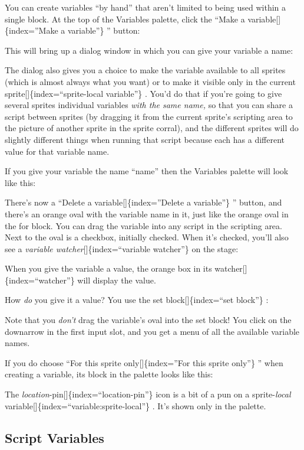 \documentclass[
  letterpaper,
]{book}
\begin{document}
You can create variables ``by hand'' that aren't limited to being used
within a single block. At the top of the Variables palette, click the
``Make a variable{[}{]}\{index=''Make a variable''\} '' button:

This will bring up a dialog window in which you can give your variable a
name:

The dialog also gives you a choice to make the variable available to all
sprites (which is almost always what you want) or to make it visible
only in the current sprite{[}{]}\{index=``sprite-local variable''\} .
You'd do that if you're going to give several sprites individual
variables \emph{with the same name,} so that you can share a script
between sprites (by dragging it from the current sprite's scripting area
to the picture of another sprite in the sprite corral), and the
different sprites will do slightly different things when running that
script because each has a different value for that variable name.

If you give your variable the name ``name'' then the Variables palette
will look like this:

There's now a ``Delete a variable{[}{]}\{index=''Delete a variable''\}
'' button, and there's an orange oval with the variable name in it, just
like the orange oval in the for block. You can drag the variable into
any script in the scripting area. Next to the oval is a checkbox,
initially checked. When it's checked, you'll also see a \emph{variable
watcher}{[}{]}\{index=``variable watcher''\} on the stage:

When you give the variable a value, the orange box in its
watcher{[}{]}\{index=``watcher''\} will display the value.

How \emph{do} you give it a value? You use the set
block{[}{]}\{index=``set block''\} :

Note that you \emph{don't} drag the variable's oval into the set block!
You click on the downarrow in the first input slot, and you get a menu
of all the available variable names.

If you do choose ``For this sprite only{[}{]}\{index=''For this sprite
only''\} '' when creating a variable, its block in the palette looks
like this:

The \emph{location}-pin{[}{]}\{index=``location-pin''\} icon is a bit of
a pun on a sprite-\emph{local}
variable{[}{]}\{index=``variable:sprite-local''\} . It's shown only in
the palette.

\subsection{Script Variables}\label{script-variables}
\end{document}
